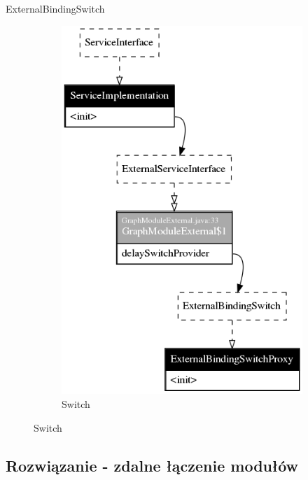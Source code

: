 \documentclass[smaller]{beamer}
\begin{document}
\begin{frame}{ExternalBindingSwitch}
\begin{figure}
\begin{subfigure}[b]{0.3\textwidth}
                \includegraphics[width=\textwidth]{switchBinding}
                \caption{Switch}
        \end{subfigure}%
\end{figure}
\end{frame}


\subsection{Rozwiązanie - zdalne łączenie modułów}
\end{document}
